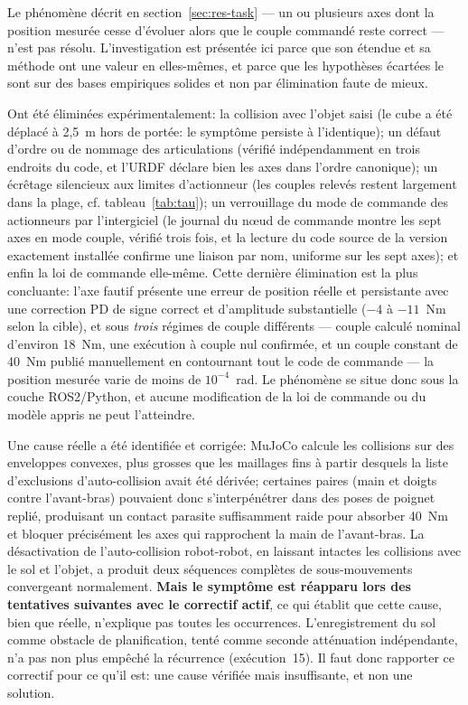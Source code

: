\documentclass[a4paper, oneside]{article}
\begin{document}
Le phénomène décrit en section~\ref{sec:res-task} — un ou plusieurs axes dont la
position mesurée cesse d'évoluer alors que le couple commandé reste correct —
n'est pas résolu. L'investigation est présentée ici parce que son étendue et sa
méthode ont une valeur en elles-mêmes, et parce que les hypothèses écartées le
sont sur des bases empiriques solides et non par élimination faute de mieux.

Ont été éliminées expérimentalement: la collision avec l'objet saisi (le cube a
été déplacé à 2{,}5~m hors de portée: le symptôme persiste à l'identique); un
défaut d'ordre ou de nommage des articulations (vérifié indépendamment en trois
endroits du code, et l'URDF déclare bien les axes dans l'ordre canonique); un
écrêtage silencieux aux limites d'actionneur (les couples relevés restent
largement dans la plage, cf. tableau~\ref{tab:tau}); un verrouillage du mode de
commande des actionneurs par l'intergiciel (le journal du n\oe ud de commande
montre les sept axes en mode couple, vérifié trois fois, et la lecture du code
source de la version exactement installée confirme une liaison par nom, uniforme
sur les sept axes); et enfin la loi de commande elle-même. Cette dernière
élimination est la plus concluante: l'axe fautif présente une erreur de
position réelle et persistante avec une correction PD de signe correct et
d'amplitude substantielle ($-4$ à $-11$~Nm selon la cible), et sous \emph{trois}
régimes de couple différents — couple calculé nominal d'environ 18~Nm, une
exécution à couple nul confirmée, et un couple constant de 40~Nm publié
manuellement en contournant tout le code de commande — la position mesurée varie
de moins de $10^{-4}$~rad. Le phénomène se situe donc sous la couche
ROS2/Python, et aucune modification de la loi de commande ou du modèle appris ne
peut l'atteindre.

Une cause réelle a été identifiée et corrigée: MuJoCo calcule les collisions
sur des enveloppes convexes, plus grosses que les maillages fins à partir
desquels la liste d'exclusions d'auto-collision avait été dérivée; certaines
paires (main et doigts contre l'avant-bras) pouvaient donc s'interpénétrer dans
des poses de poignet replié, produisant un contact parasite suffisamment raide
pour absorber 40~Nm et bloquer précisément les axes qui rapprochent la main de
l'avant-bras. La désactivation de l'auto-collision robot-robot, en laissant
intactes les collisions avec le sol et l'objet, a produit deux séquences
complètes de sous-mouvements convergeant normalement. \textbf{Mais le symptôme
est réapparu lors des tentatives suivantes avec le correctif actif}, ce qui
établit que cette cause, bien que réelle, n'explique pas toutes les occurrences.
L'enregistrement du sol comme obstacle de planification, tenté comme seconde
atténuation indépendante, n'a pas non plus empêché la récurrence
(exécution~15). Il faut donc rapporter ce correctif pour ce qu'il est: une
cause vérifiée mais insuffisante, et non une solution.
\end{document}
